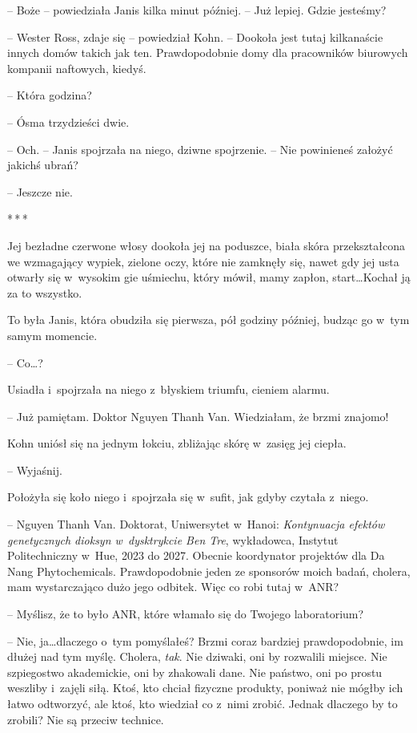 \documentclass[oneside,polish,11pt,sfheadings]{mwbk}
\newcommand{\threeast}{\bigskip\par\centerline{*\,*\,*}\medskip\par}%
\begin{document}
-- Boże -- powiedziała Janis kilka minut później. -- Już lepiej. Gdzie
jesteśmy?

-- Wester Ross, zdaje się -- powiedział Kohn. -- Dookoła jest tutaj
kilkanaście innych domów takich jak ten. Prawdopodobnie domy dla
pracowników biurowych kompanii naftowych, kiedyś.

-- Która godzina?

-- Ósma trzydzieści dwie.

-- Och. -- Janis spojrzała na niego, dziwne spojrzenie. -- Nie powinieneś
założyć jakichś ubrań?

-- Jeszcze nie.
  \threeast 

Jej bezładne czerwone włosy dookoła jej na poduszce, biała skóra
przekształcona we wzmagający wypiek, zielone oczy, które nie zamknęły
się, nawet gdy jej usta otwarły się w~wysokim gie uśmiechu, który mówił,
mamy zapłon, start\ldots Kochał ją za to wszystko.

To była Janis, która obudziła się pierwsza, pół godziny później, budząc
go w~tym samym momencie.

-- Co\ldots ?

Usiadła i~spojrzała na niego z~błyskiem triumfu, cieniem alarmu. 

-- Już
pamiętam. Doktor Nguyen Thanh Van. Wiedziałam, że brzmi znajomo!

Kohn uniósł się na jednym łokciu, zbliżając skórę w~zasięg jej ciepła. 

-- Wyjaśnij.

Położyła się koło niego i~spojrzała się w~sufit, jak gdyby czytała z~niego. 

-- Nguyen Thanh Van. Doktorat, Uniwersytet w~Hanoi:
\emph{Kontynuacja efektów genetycznych dioksyn w~dysktrykcie Ben Tre},
wykładowca, Instytut Politechniczny w~Hue, 2023 do 2027. Obecnie
koordynator projektów dla Da Nang Phytochemicals. Prawdopodobnie jeden
ze sponsorów moich badań, cholera, mam wystarczająco dużo jego odbitek.
Więc co robi tutaj w~ANR?

-- Myślisz, że to było ANR, które włamało się do Twojego laboratorium?

-- Nie, ja\ldots dlaczego o~tym pomyślałeś? Brzmi coraz bardziej
prawdopodobnie, im dłużej nad tym myślę. Cholera, \emph{tak}. Nie
dziwaki, oni by rozwalili miejsce. Nie szpiegostwo akademickie, oni by
zhakowali dane. Nie państwo, oni po prostu weszliby i~zajęli siłą. Ktoś,
kto chciał fizyczne produkty, poniważ nie mógłby ich łatwo odtworzyć,
ale ktoś, kto wiedział co z~nimi zrobić. Jednak dlaczego by to zrobili?
Nie są przeciw technice.
\end{document}
